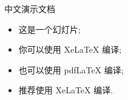 \documentclass{beamer}
\begin{document}
	 \begin{frame}{中文演示文档} 
	 \begin{itemize}[<+->]
\item 这是一个幻灯片;
\item 你可以使用 XeLaTeX 编译;
 \item 也可以使用 pdfLaTeX 编译; 
 \item 推荐使用 XeLaTeX 编译.
\end{itemize}
\end{frame}
\end{document}
